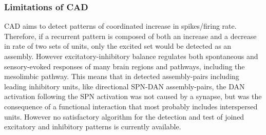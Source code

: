 \subsubsection{Limitations of CAD}
CAD aims to detect patterns of coordinated increase in spikes/firing rate. Therefore, if a recurrent pattern is composed of both an increase and a decrease in rate of two sets of units, only the excited set would be detected as an assembly. However excitatory-inhibitory balance regulates both spontaneous and sensory-evoked responses of many brain regions and pathways, including the mesolimbic pathway. This means that in detected assembly-pairs including leading inhibitory units, like directional SPN-DAN assembly-pairs, the DAN activation following the SPN activation was not caused by a synapse, but was the consequence of a functional interaction that most probably includes interspersed units. However no satisfactory algorithm for the detection and test of joined excitatory and inhibitory patterns is currently available.
